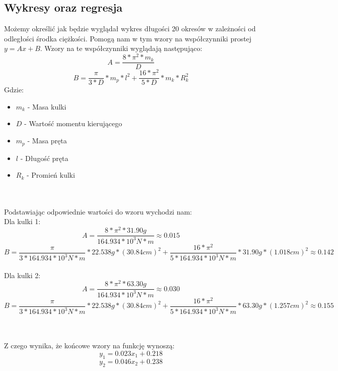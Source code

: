 \documentclass{article}
\begin{document}
{\subsection*{Wykresy oraz regresja}
Możemy określić jak będzie wyglądał wykres długości 20 okresów w zależności od odległości środka ciężkości. Pomogą nam w tym wzory na współczynniki prostej $y = Ax + B$. Wzory na te współczynniki wyglądają następująco:
\[A = \frac{8*\pi^2*m_k}{D}\]
\[B = \frac{\pi}{3*D}*m_p*l^2+\frac{16*\pi^2}{5*D}*m_k*R_k^2\]
Gdzie:
\begin{itemize}
    \item $m_k$ - Masa kulki
    \item $D$ - Wartość momentu kierującego
    \item $m_p$ - Masa pręta
    \item $l$ - Długość pręta
    \item $R_k$ - Promień kulki
\end{itemize}
\textbf{} \\
\textbf{} \\
Podstawiając odpowiednie wartości do wzoru wychodzi nam: \\
Dla kulki 1:
\[A = \frac{8*\pi^2*31.90g}{164.934*10^3N*m} \approx 0.015\]
\[B = \frac{\pi}{3*164.934*10^3N*m}*22.538g*(30.84cm)^2+\frac{16*\pi^2}{5*164.934*10^3N*m}*31.90g*(1.018cm)^2 \approx 0.142\]
\textbf{} \\
Dla kulki 2:
\[A = \frac{8*\pi^2*63.30g}{164.934*10^3N*m} \approx 0.030\]
\[B = \frac{\pi}{3*164.934*10^3N*m}*22.538g*(30.84cm)^2+\frac{16*\pi^2}{5*164.934*10^3N*m}*63.30g*(1.257cm)^2 \approx 0.155\]

\textbf{} \\
\textbf{} \\
Z czego wynika, że końcowe wzory na funkcję wynoszą:
\[y_1=0.023x_1+0.218\]
\[y_2=0.046x_2+0.238\]

}
\end{document}
